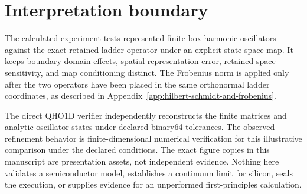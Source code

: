 \clearpage
\section{Interpretation boundary}

The calculated experiment tests represented finite-box harmonic oscillators
against the exact retained ladder operator under an explicit state-space map.
It keeps boundary-domain effects, spatial-representation error, retained-space
sensitivity, and map conditioning distinct. The Frobenius norm is applied only
after the two operators have been placed in the same orthonormal ladder
coordinates, as described in
Appendix~\ref{app:hilbert-schmidt-and-frobenius}.

The direct QHO1D verifier independently reconstructs the finite matrices and analytic
oscillator states under declared binary64 tolerances. The observed refinement behavior
is finite-dimensional numerical verification for this illustrative comparison under
the declared conditions. The exact figure copies in this manuscript are presentation
assets, not independent evidence. Nothing here validates a semiconductor model,
establishes a continuum limit for silicon, seals the execution, or supplies evidence
for an unperformed first-principles calculation.
